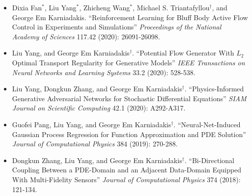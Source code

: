 \begin{itemize}[leftmargin=*]
\item Dixia Fan$^*$, {Liu Yang}$^*$, Zhicheng Wang$^*$, Michael S. Triantafyllou$^\dagger$, and George Em Karniadakis. ``Reinforcement Learning for Bluff Body Active Flow Control in Experiments and Simulations'' \textit{Proceedings of the National Academy of Sciences} 117.42 (2020): 26091-26098.
\item {Liu Yang}, and George Em Karniadakis$^\dagger$. ``Potential Flow Generator With $L_2$ Optimal Transport Regularity for Generative Models'' \textit{IEEE Transactions on Neural Networks and Learning Systems} 33.2 (2020): 528-538.
\item {Liu Yang}, Dongkun Zhang, and George Em Karniadakis$^\dagger$. ``Physics-Informed Generative Adversarial Networks for Stochastic Differential Equations'' \textit{SIAM Journal on Scientific Computing} 42.1 (2020): A292-A317.
\item Guofei Pang, {Liu Yang}, and George Em Karniadakis$^\dagger$. ``Neural-Net-Induced Gaussian Process Regression for Function Approximation and PDE Solution'' \textit{Journal of Computational Physics} 384 (2019): 270-288.
\item Dongkun Zhang, {Liu Yang}, and George Em Karniadakis$^\dagger$. ``Bi-Directional Coupling Between a PDE-Domain and an Adjacent Data-Domain Equipped With Multi-Fidelity Sensors'' \textit{Journal of Computational Physics} 374 (2018): 121-134.
\end{itemize}
